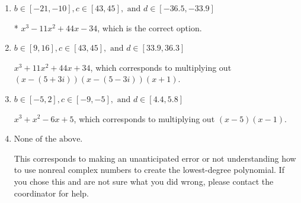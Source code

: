 \documentclass{extbook}[14pt]
\begin{document}
\begin{enumerate}
{\begin{enumerate}[label=\Alph*.]
$x^{3} + x^{2} -4 x + 3$, which corresponds to multiplying out $(x -3)(x -1)$.
\item \( b \in [-21, -10], c \in [43, 45], \text{ and } d \in [-36.5, -33.9] \)

* $x^{3} -11 x^{2} +44 x -34$, which is the correct option.
\item \( b \in [9, 16], c \in [43, 45], \text{ and } d \in [33.9, 36.3] \)

$x^{3} +11 x^{2} +44 x + 34$, which corresponds to multiplying out $(x-(5 + 3 i))(x-(5 - 3 i))(x + 1)$.
\item \( b \in [-5, 2], c \in [-9, -5], \text{ and } d \in [4.4, 5.8] \)

$x^{3} + x^{2} -6 x + 5$, which corresponds to multiplying out $(x -5)(x -1)$.
\item \( \text{None of the above.} \)

This corresponds to making an unanticipated error or not understanding how to use nonreal complex numbers to create the lowest-degree polynomial. If you chose this and are not sure what you did wrong, please contact the coordinator for help.
\end{enumerate}

}
\end{enumerate}
\end{document}
